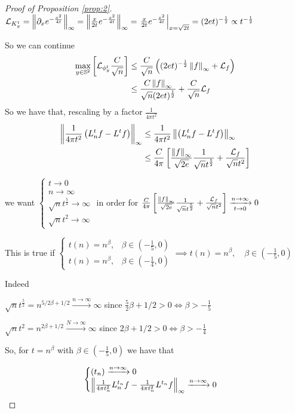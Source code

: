 \begin{proof}[Proof of Proposition \ref{prop:2}]
	$\mathcal L_{K^t_y} = \left\lVert\partial_x e^{-\frac{x^2}{4t}}\right\rVert_\infty = \left\lVert\frac{x}{2t}e^{-\frac{x^2}{4t}}\right\rVert_\infty = \left. \frac{x}{2t}e^{-\frac{x^2}{4t}}\right|_{x=\sqrt{2t}}=(2et)^{-\frac{1}{2}}\propto t ^ {-\frac{1}{2}}$
	
	So we can continue
	\begin{align*}
		\max _{y\in \mathbb S^2} \left[  \mathcal L_{\phi^t_y} \frac{C}{\sqrt{n}} \right]
		&\leq  \frac{C}{\sqrt{n}} \left( (2et)^{-\frac{1}{2}} \left\lVert f\right\rVert_\infty + \mathcal L_f \right)\\
		&\leq \frac{C\left\lVert f\right\rVert_\infty}{\sqrt{n}(2et)^\frac{1}{2}} +   \frac{C}{\sqrt{n}}\mathcal L_f\\
	\end{align*}
	So we have that, rescaling by a factor $\frac{1}{4\pi t^2}$
	\begin{align*}
		\left\lVert\frac{1}{4\pi t^2}\left(L_n^tf-L^tf\right)\right\rVert_\infty&\leq \frac{1}{4\pi t^2}\left\lVert\left(L_n^tf-L^tf\right)\right\rVert_\infty \\
		&\leq \frac{C}{4\pi}\left[\frac{\left\lVert f\right\rVert_\infty}{\sqrt{2e}}\frac{1}{\sqrt{n}t^\frac{5}{2}} + \frac{\mathcal L_f}{\sqrt{n}t^2}\right]
	\end{align*}

	
	we want $\begin{cases}
	t \rightarrow 0\\
	n \rightarrow \infty\\
	\sqrt{n}t^\frac{5}{2} \rightarrow \infty\\
	\sqrt{n}t^2 \rightarrow \infty
	\end{cases}$ in order for $ \frac{C}{4\pi}\left[\frac{\left\lVert f\right\rVert_\infty}{\sqrt{2e}}\frac{1}{\sqrt{n}t^\frac{5}{2}} + \frac{\mathcal L_f}{\sqrt{n}t^2}\right] \xrightarrow[t\to 0 ]{n\to\infty}0$
	
	This is true if $\begin{cases}
	t(n) = n^\beta, &\beta\in(-\frac{1}{5}, 0) \\
	t(n) = n^\beta, &\beta\in(-\frac{1}{4}, 0)
	\end{cases} \implies t(n) = n^\beta, \quad \beta\in(-\frac{1}{5}, 0)$
	
	Indeed 
	
	$\sqrt{n}t^\frac{5}{2}=n^{5/2\beta+1/2}\xrightarrow{n \to \infty} \infty$ since $\frac{5}{2}\beta+1/2>0 \iff \beta>-\frac{1}{5}$
	
	$\sqrt{n}t^2=n^{2\beta+1/2}\xrightarrow {N \to \infty} \infty$ since $2\beta+1/2>0 \iff \beta>-\frac{1}{4}$
	
	So, for $t=n^\beta$ with $\beta\in(-\frac{1}{5}, 0)$ we have that 
	
	$$\begin{cases}
	(t_n)\xrightarrow{n\to\infty}0\\
	\left\lVert\frac{1}{4\pi t_n^2}L_n^{t_n}f-\frac{1}{4\pi t_n^2}L^{t_n}f\right\rVert_\infty  \xrightarrow{n\to\infty}0
	\end{cases}$$
	
\end{proof}

